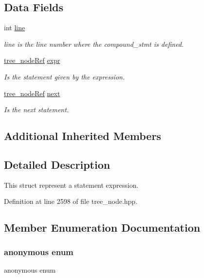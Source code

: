 \subsection*{Data Fields}
\begin{DoxyCompactItemize}
\item 
int \hyperlink{structexpr__stmt_a505090c6214112d2456f6891439e3bb5}{line}
\begin{DoxyCompactList}\small\item\em line is the line number where the compound\+\_\+stmt is defined. \end{DoxyCompactList}\item 
\hyperlink{tree__node_8hpp_a6ee377554d1c4871ad66a337eaa67fd5}{tree\+\_\+node\+Ref} \hyperlink{structexpr__stmt_a3be5eb629c0d2d3e6680f3df319d45b3}{expr}
\begin{DoxyCompactList}\small\item\em Is the statement given by the expression. \end{DoxyCompactList}\item 
\hyperlink{tree__node_8hpp_a6ee377554d1c4871ad66a337eaa67fd5}{tree\+\_\+node\+Ref} \hyperlink{structexpr__stmt_a01ecbff4b58cd37ea26fd2f682e8f050}{next}
\begin{DoxyCompactList}\small\item\em Is the next statement. \end{DoxyCompactList}\end{DoxyCompactItemize}
\subsection*{Additional Inherited Members}


\subsection{Detailed Description}
This struct represent a statement expression. 

Definition at line 2598 of file tree\+\_\+node.\+hpp.



\subsection{Member Enumeration Documentation}
\mbox{\label{structexpr__stmt_a2cf275af9f5cbba5db5011aaf2a0a9d0}} 
\subsubsection{\texorpdfstring{anonymous enum}{anonymous enum}}
{\footnotesize\ttfamily anonymous enum}




